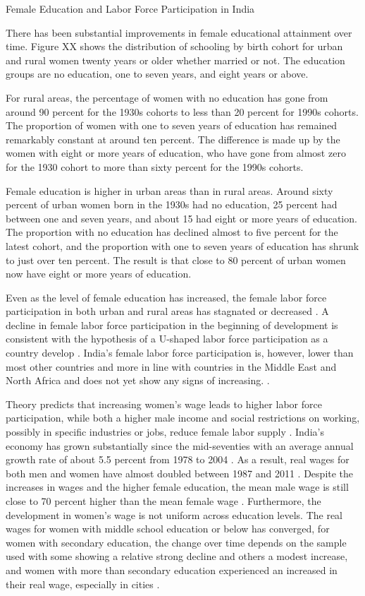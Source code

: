 Female Education and Labor Force Participation in India

There has been substantial improvements in female educational attainment over time.
Figure XX shows the distribution of schooling by birth cohort for urban and rural women 
twenty years or older whether married or not.
The education groups are no education, one to seven years, and eight years or
above.

For rural areas, the percentage of women with no education has gone from around 90 percent
for the 1930s cohorts to less than 20 percent for 1990s cohorts. 
The proportion of women with one to seven years of education has remained remarkably
constant at around ten percent.
The difference is made up by the women with eight or more years of education, who have
gone from almost zero for the 1930 cohort to more than sixty percent for the 1990s cohorts.

Female education is higher in urban areas than in rural areas.
Around sixty percent of urban women born in the 1930s had no education, 25 percent had
between one and seven years, and about 15 had eight or more years of education.
The proportion with no education has declined almost to five percent for the latest
cohort, and the proportion with one to seven years of education has shrunk to just over
ten percent.
The result is that close to 80 percent of urban women now have eight or more years of
education.


Even as the level of female education has increased, the female labor force participation 
in both urban and rural areas has stagnated or decreased
\citep{Klasen2015,Afridi2018,Bhargava2018, Chatterjee2018, Bhargava2019}.
A decline in female labor force participation in the beginning of development is
consistent with the hypothesis of a U-shaped labor force participation as a country
develop \citep{Goldin1994}.
India's female labor force participation is, however, lower than most other
countries and more in line with countries in the Middle East and North Africa and
does not yet show any signs of increasing.
\citep{Klasen2015,Chatterjee2018}.

Theory predicts that increasing women's wage leads to higher labor force participation, 
while both a higher male income and social restrictions on working, possibly in 
specific industries or jobs, reduce female labor supply \citep{Goldin1994}.
India's economy has grown substantially since the mid-seventies with
an average annual growth rate of about 5.5 percent from 1978 to 2004 \citet{Bosworth2008}.
As a result, real wages for both men and women have almost doubled between 1987 and 2011 
\citep{Klasen2015}.
Despite the increases in wages and the higher female education, the mean male wage is
still close to 70 percent higher than the mean female wage \citep{Bhargava2018}.
Furthermore, the development in women's wage is not uniform across education levels.
The real wages for women with middle school education or below has converged, 
for women with secondary education, the change over time depends on the sample used
with some showing a relative strong decline and others a modest increase,
and women with more than secondary education experienced an increased in their real 
wage, especially in cities \citep{Klasen2015,Bhargava2018}.

